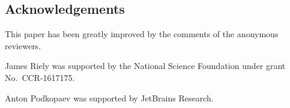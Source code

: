 










\subsection*{Acknowledgements}
This paper has been greatly improved by the comments of the anonymous reviewers.

James Riely was supported by the National Science Foundation under
grant No.~CCR-1617175.


Anton Podkopaev was supported by JetBrains Research.


